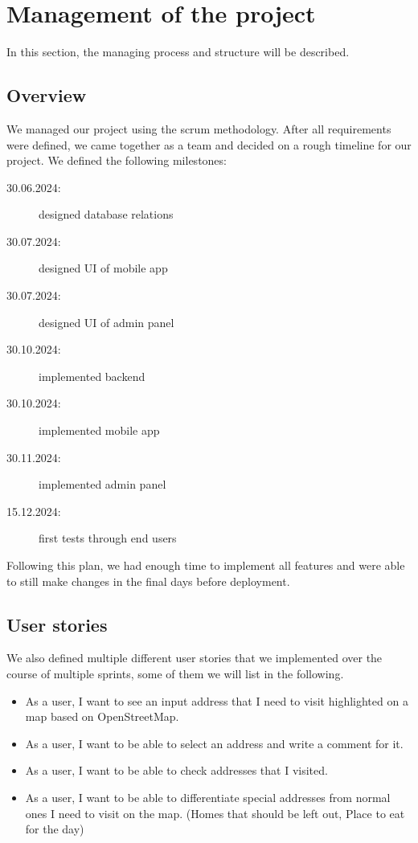 \Author{\daAuthorTwo}

\section{Management of the project}

In this section, the managing process and structure will be described.

\subsection{Overview}
We managed our project using the scrum methodology. After all requirements were defined, we came together as a team and decided on a rough timeline for our project. We defined the following milestones:

\begin{description}
    \item [30.06.2024:] designed database relations
    \item [30.07.2024:] designed UI of mobile app 
    \item [30.07.2024:] designed UI of admin panel
    \item [30.10.2024:] implemented backend
    \item [30.10.2024:] implemented mobile app
    \item [30.11.2024:] implemented admin panel
    \item [15.12.2024:] first tests through end users
\end{description}

Following this plan, we had enough time to implement all features and were able to still make changes in the final days before deployment. 

\subsection{User stories}

We also defined multiple different user stories that we implemented over the course of multiple sprints, some of them we will list in the following.

\begin{itemize}
    \item As a user, I want to see an input address that I need to visit highlighted on a map based on OpenStreetMap.
    \item As a user, I want to be able to select an address and write a comment for it.
    \item As a user, I want to be able to check addresses that I visited.
    \item As a user, I want to be able to differentiate special addresses from normal ones I need to visit on the map. (Homes that should be left out, Place to eat for the day)
\end{itemize}

